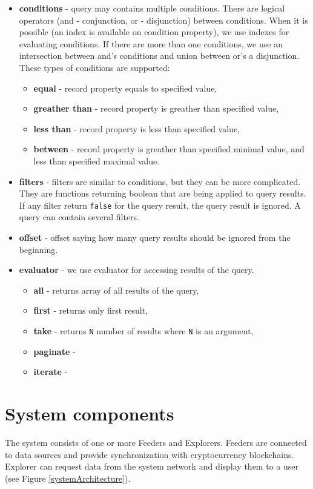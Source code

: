 \begin{itemize}
    \item \textbf{conditions} - query may contains multiple conditions. There are logical operators (and - conjunction, or - disjunction) between conditions. When it is possible (an index is available on condition property), we use indexes for evaluating conditions. If there are more than one conditions, we use an intersection between and's conditions and union between or's a disjunction. These types of conditions are supported:
    \begin{itemize}
        \item \textbf{equal} - record property equals to specified value,
        \item \textbf{greather than} - record property is greather than specified value,
        \item \textbf{less than} - record property is less than specified value,
        \item \textbf{between} - record property is greather than specified minimal value, and less than specified maximal value.
    \end{itemize} 
    \item \textbf{filters} - filters are similar to conditions, but they can be more complicated. They are functions returning boolean that are being applied to query results. If any filter return \texttt{false} for the query result, the query result is ignored. A query can contain several filters.
    \item \textbf{offset} - offset saying how many query results should be ignored from the beginning.
    \item \textbf{evaluator} - we use evaluator for accessing results of the query.
    \begin{itemize}
        \item \textbf{all} - returns array of all results of the query,
        \item \textbf{first} - returns only first result,
        \item \textbf{take} - returns \texttt{N} number of results where \texttt{N} is an argument,
        \item \textbf{paginate} - 
        \item \textbf{iterate} -
    \end{itemize}
\end{itemize}  

\section{System components}
The system consists of one or more Feeders and Explorers. Feeders are connected to data sources and provide synchronization with cryptocurrency blockchains. Explorer can request data from the system network and display them to a user (see Figure \ref{systemArchitecture}).

